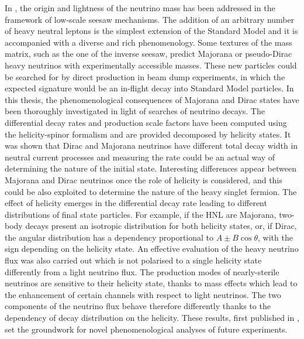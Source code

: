 In , the origin and lightness of the neutrino mass has been addressed %
in the framework of low-scale seesaw mechanisms.
The addition of an arbitrary number of heavy neutral leptons is the simplest extension of the Standard Model %
and it is accompanied with a diverse and rich phenomenology.
Some textures of the mass matrix, such as the one of the inverse seesaw, %
predict Majorana or pseudo-Dirac heavy neutrinos with experimentally accessible masses.
These new particles could be searched for by direct production in beam dump experiments, %
in which the expected signature would be an in-flight decay into Standard Model particles.
In this thesis, the phenomenological consequences of Majorana and Dirac states have been thoroughly investigated %
in light of searches of neutrino decays.
The differential decay rates and production scale factors have been computed using %
the helicity-spinor formalism and are provided decomposed by helicity states.
It was shown that Dirac and Majorana neutrinos have different total decay width in neutral current processes %
and measuring the rate could be an actual way of determining the nature of the initial state.
Interesting differences appear between Majorana and Dirac neutrinos once the role of helicity is considered, %
and this could be also exploited to determine the nature of the heavy singlet fermion.
The effect of helicity emerges in the differential decay rate leading to different %
distributions of final state particles. %
For example, if the HNL are Majorana, two-body decays present an isotropic distribution for both helicity states, %
or, if Dirac, the angular distribution has a dependency proportional to $A\pm B \cos\theta$, %
with the sign depending on the helicity state.
An effective evaluation of the heavy neutrino flux was also carried out %
which is not polarised to a single helicity state differently from a light neutrino flux.
The production modes of nearly-sterile neutrinos are sensitive to their helicity state, %
thanks to mass effects which lead to the enhancement of certain channels with respect to light neutrinos.
The two components of the neutrino flux behave therefore differently thanks to the dependency of decay distribution on the helicity.
These results, first published in , set the groundwork for novel phenomenological analyses %
of future experiments.

